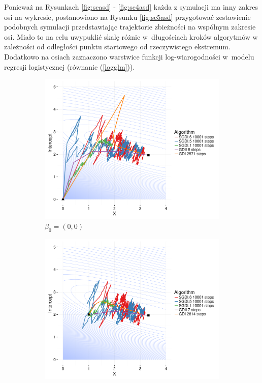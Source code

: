 \newpage

Ponieważ na Rysunkach \ref{fig:scasd} - \ref{fig:sc4asd} każda z symulacji ma inny zakres osi na wykresie, postanowiono na Rysunku \ref{fig:sc5asd} przygotować zestawienie podobnych symulacji przedstawiając trajektorie zbieżności na wspólnym zakresie osi. Miało to na celu uwypuklić skalę różnic w~długościach kroków algorytmów w zależności od odległości punktu startowego od rzeczywistego ekstremum. Dodatkowo na osiach zaznaczono warstwice funkcji log-wiarogodności w~modelu regresji logistycznej (równanie (\ref{logglm})).

\begin{figure}[h!]
  \begin{center}
   \begin{subfigure}[h!]{0.49\textwidth}
     \includegraphics[width=\textwidth]{Obrazki/Numeryka/contour_00.pdf}
     \caption{$\beta_0 = (0,0)$}
   \end{subfigure}
   \begin{subfigure}[h!]{0.49\textwidth}
        \includegraphics[width=\textwidth]{Obrazki/Numeryka/contour_2_1.pdf}

\end{subfigure}
\end{center}
\end{figure}

